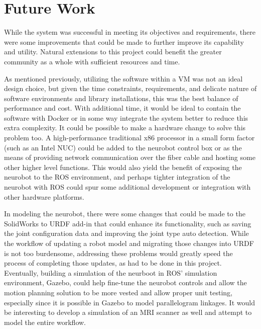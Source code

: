 \documentclass[12pt]{report}
\begin{document}
\chapter{Future Work}
While the system was successful in meeting its objectives and requirements, there were some improvements that could be made to further improve its capability and utility. Natural extensions to this project could benefit the greater community as a whole with sufficient resources and time.

As mentioned previously, utilizing the software within a VM was not an ideal design choice, but given the time constraints, requirements, and delicate nature of software environments and library installations, this was the best balance of performance and cost. With additional time, it would be ideal to contain the software with Docker or in some way integrate the system better to reduce this extra complexity. It could be possible to make a hardware change to solve this problem too. A high-performance traditional x86 processor in a small form factor (such as an Intel NUC) could be added to the neurobot control box or as the means of providing network communication over the fiber cable and hosting some other higher level functions. This would also yield the benefit of exposing the neurobot to the ROS environment, and perhaps tighter integration of the neurobot with ROS could spur some additional development or integration with other hardware platforms.

In modeling the neurobot, there were some changes that could be made to the SolidWorks to URDF add-in that could enhance its functionality, such as saving the joint configuration data and improving the joint type auto detection. While the workflow of updating a robot model and migrating those changes into URDF is not too burdensome, addressing these problems would greatly speed the process of completing those updates, as had to be done in this project. Eventually, building a simulation of the neurboot in ROS' simulation environment, Gazebo, could help fine-tune the neurobot controls and allow the motion planning solution to be more vested and allow proper unit testing, especially since it is possible in Gazebo to model parallelogram linkages. It would be interesting to develop a simulation of an MRI scanner as well and attempt to model the entire workflow. 
\end{document}
